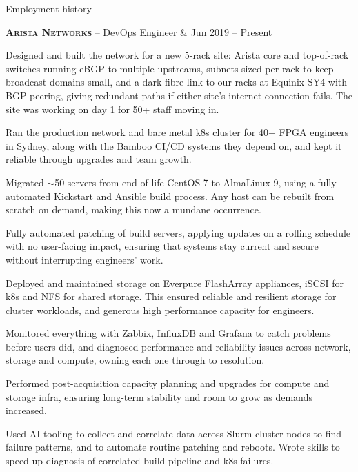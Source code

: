 \documentclass[a4paper,10pt]{article}
\begin{document}

\begin{resumeblock}{Employment history}

\begin{resumejob}{%
\textbf{\textsc{Arista Networks}} -- DevOps Engineer & Jun 2019 -- Present
}
%
\item Designed and built the network for a new 5-rack site: Arista core and top-of-rack switches running eBGP to multiple upstreams, subnets sized per rack to keep broadcast domains small, and a dark fibre link to our racks at Equinix SY4 with BGP peering, giving redundant paths if either site's internet connection fails. The site was working on day 1 for 50+ staff moving in.
\item Ran the production network and bare metal k8s cluster for 40+ FPGA engineers in Sydney, along with the Bamboo CI/CD systems they depend on, and kept it reliable through upgrades and team growth.
\item Migrated $\sim$50 servers from end-of-life CentOS 7 to AlmaLinux 9, using a fully automated Kickstart and Ansible build process. Any host can be rebuilt from scratch on demand, making this now a mundane occurrence.
\item Fully automated patching of build servers, applying updates on a rolling schedule with no user-facing impact, ensuring that systems stay current and secure without interrupting engineers' work.
\item Deployed and maintained storage on Everpure FlashArray appliances, iSCSI for k8s and NFS for shared storage. This ensured reliable and resilient storage for cluster workloads, and generous high performance capacity for engineers.
\item Monitored everything with Zabbix, InfluxDB and Grafana to catch problems before users did, and diagnosed performance and reliability issues across network, storage and compute, owning each one through to resolution.
\item Performed post-acquisition capacity planning and upgrades for compute and storage infra, ensuring long-term stability and room to grow as demands increased.
\item Used AI tooling to collect and correlate data across Slurm cluster nodes to find failure patterns, and to automate routine patching and reboots. Wrote skills to speed up diagnosis of correlated build-pipeline and k8s failures.
\end{resumejob}
\vspace{3mm}


\end{resumeblock}
\end{document}
